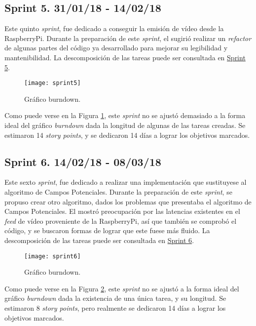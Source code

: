 \subsection{Sprint 5. 31/01/18 - 14/02/18}

Este quinto \emph{sprint}, fue dedicado a conseguir la emisión de vídeo desde la RaspberryPi.
Durante la preparación de este \emph{sprint}, el \cotutorOne{} sugirió realizar un \emph{refactor} de algunas partes del código ya desarrollado para mejorar su legibilidad y mantenibilidad.
La descomposición de las tareas puede ser consultada en \href{https://github.com/mbm0089/gii_0_17.02_snsi/milestone/5?closed=1}{Sprint 5}.

\begin{figure}[H]
	\centering
	\texttt{[image: sprint5]}
	\caption[Burndown Sprint 5]{Gráfico burndown.}\label{fig:sprint5}
\end{figure}

Como puede verse en la Figura \ref{fig:sprint5}, este \emph{sprint} no se ajustó demasiado a la forma ideal del gráfico \emph{burndown} dada la longitud de algunas de las tareas creadas.
Se estimaron 14 \emph{story points}, y se dedicaron 14 días a lograr los objetivos marcados.

\subsection{Sprint 6. 14/02/18 - 08/03/18}

Este sexto \emph{sprint}, fue dedicado a realizar una implementación que sustituyese al algoritmo de Campos Potenciales.
Durante la preparación de este \emph{sprint}, se propuso crear otro algoritmo, dados los problemas que presentaba el algoritmo de Campos Potenciales. El \cotutorOne{} mostró preocupación por las latencias existentes en el \emph{feed} de vídeo proveniente de la RaspberryPi, así que también se comprobó el código, y se buscaron formas de lograr que este fuese más fluido.
La descomposición de las tareas puede ser consultada en \href{https://github.com/mbm0089/gii_0_17.02_snsi/milestone/6?closed=1}{Sprint 6}.

\begin{figure}[H]
	\centering
	\texttt{[image: sprint6]}
	\caption[Burndown Sprint 6]{Gráfico burndown.}\label{fig:sprint6}
\end{figure}

Como puede verse en la Figura \ref{fig:sprint6}, este \emph{sprint} no se ajustó a la forma ideal del gráfico \emph{burndown} dada la existencia de una única tarea, y su longitud.
Se estimaron 8 \emph{story points}, pero realmente se dedicaron 14 días a lograr los objetivos marcados.

